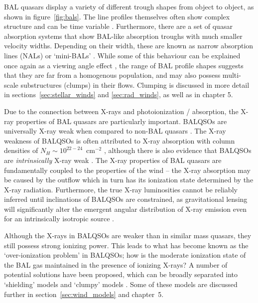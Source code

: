 BAL quasars display a variety of different trough shapes from object 
to object, as shown in figure~\ref{fig:bals}. The 
line profiles themselves often show complex structure 
\citep{foltz1987,ganguly2006, simonhamann2010} and can be time variable 
\citep{hall2011, capellupo2011,capellupo2012,capellupo2014, filizak2012}. 
Furthermore, there are a set of quasar absorption systems that show
BAL-like absorption troughs with much smaller velocity widths. Depending 
on their width, these are known as narrow absorption lines (NALs) or `mini-BALs'
\citep{misawa2007,misawa2008,nestor2008}.
While some of this behaviour can be explained once again as a viewing angle
effect \citep[e.g. ][]{ganguly2001}, the range of BAL profile shapes suggests that they 
are far from a homogenous population, and may also possess
multi-scale substructures (clumps) in their flows. Clumping
is discussed in more detail in sections~\ref{sec:stellar_winds} and 
\ref{sec:rad_winds}, as well as in chapter 5.

Due to the connection between X-rays and photoionization / absorption, the 
X-ray properties of BAL quasars are particularly important. BALQSOs
are universally X-ray weak when compared to non-BAL quasars \citep{gibson2009}. 
The X-ray weakness of BALQSOs is often attributed to X-ray absorption 
with column densities of $N_H \sim 10^{22-24}$~cm$^{-2}$ 
\citep{gallagher1999,gallagher2002,green2001,grupe2003,stalin2011},
although there is also evidence that BALQSOs are {\em intrinsically}
X-ray weak \citep{sabra2001,clavel2006,morabito2013}.
The X-ray properties of BAL quasars are fundamentally coupled to 
the properties of the wind -- the X-ray absorption may be caused by 
the outflow which in turn has its ionization state 
determined by the X-ray radiation. Furthermore, the true X-ray 
luminosities cannot be reliably inferred until inclinations of BALQSOs are
constrained, as gravitational lensing will significantly alter the
emergent angular distribution of X-ray emission even for an intrinsically
isotropic source \citep{chen2013a, chen2013b}.

Although the X-rays in BALQSOs are weaker than in similar mass quasars,
they still possess strong ionizing power. This leads to what has become
known as the `over-ionization problem' in BALQSOs; how is the moderate 
ionization state of the BAL gas maintained in the presence of ionizing 
X-rays? A number of potential solutions have been proposed, which can be 
broadly separated into `shielding' models \citep{MCGV95,PK04} and `clumpy'
models \citep{dekool1995,hamann2013}. Some of these models are discussed
further in section~\ref{sec:wind_models} and chapter~5.

